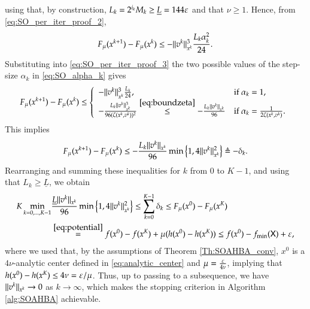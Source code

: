 using that, by construction, $L_k =2^{i_k}M_k \geq \underline{L} = 144 \varepsilon$ and that $\nu \geq 1$. 
Hence, from \eqref{eq:SO_per_iter_proof_2}, 
\begin{equation}
\label{eq:SO_per_iter_proof_3}
F_{\mu}(x^{k+1})-F_{\mu}(x^{k})\leq  - \lVert v^{k}\rVert^{3}_{x^{k}} \frac{L_k\alpha_k^2}{24}.
\end{equation}
Substituting into \eqref{eq:SO_per_iter_proof_3} the two possible values of the step-size $\alpha_k$ in \eqref{eq:SO_alpha_k} gives
\begin{equation}
\label{eq:SO_per_iter_proof_8}
F_{\mu}(x^{k+1})-F_{\mu}(x^{k})\leq 
\left\{
\begin{array}{ll}
- \lVert v^{k}\rVert^{3}_{x^{k}} \frac{L_k}{24}, & \text{if }  \alpha_k=1,\\
 -  \frac{L_k\lVert v^{k}\rVert^{3}_{x^{k}}}{96 (\zeta(x^k,v^k))^2} \stackrel{\eqref{eq:boundzeta}}{\leq} -  \frac{L_k\lVert v^{k}\rVert_{x^{k}}}{96}& \text{if } \alpha_k=\frac{1}{2\zeta(x^k,v^k)}.
\end{array}\right.
\end{equation}
This implies
\begin{equation}
\label{eq:SO_per_iter_proof_7}
F_{\mu}(x^{k+1})-F_{\mu}(x^{k}) \leq - \frac{L_k\lVert v^{k}\rVert_{x^{k}}}{96} \min\left\{1, 4\lVert v^{k}\rVert_{x^{k}}^2 \right\} \triangleq-\delta_{k}.
\end{equation}
Rearranging and summing these inequalities for $k$ from $0$ to $K-1$, and using that $L_k \geq \underline{L}$, we obtain
\begin{align}
K\min_{k=0,...,K-1} &\frac{\underline{L}\lVert v^{k}\rVert_{x^{k}}}{96} \min\left\{1, 4\lVert v^{k}\rVert_{x^{k}}^2\right\} \leq  \sum_{k=0}^{K-1} \delta_k 
\leq F_{\mu}(x^{0})-F_{\mu}(x^{K}) \notag \\
&\stackrel{\eqref{eq:potential}}{=} f(x^{0}) - f(x^{K}) + \mu (h(x^{0}) - h(x^{K})) \leq f(x^{0}) - f_{\min}(\mathsf{X}) + \varepsilon, \label{eq:SO_per_iter_proof_9}
\end{align}
where we used that, by the assumptions of Theorem \ref{Th:SOAHBA_conv}, $x^{0}$ is a $4\nu$-analytic center defined in \eqref{eq:analytic_center} and $\mu = \frac{\varepsilon}{4\nu}$, implying that $h(x^{0}) - h(x^{K}) \leq 4\nu = \varepsilon/\mu$.
Thus, up to passing to a subsequence, we have $\lVert v^{k}\rVert_{x^{k}} \to 0$ as $k \to \infty$, which makes the stopping criterion in Algorithm \ref{alg:SOAHBA} achievable.

